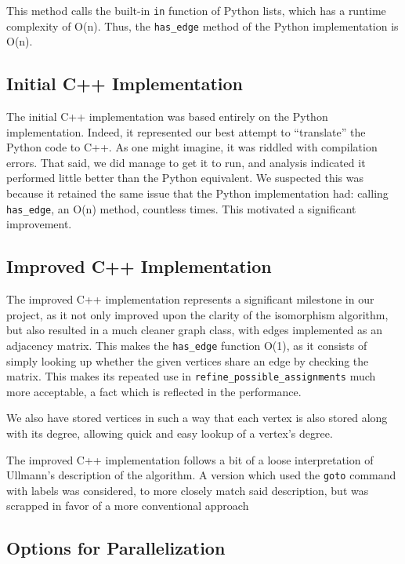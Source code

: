 \documentclass{article}
\begin{document}
  This method calls the built-in \texttt{in} function of Python lists, which has a runtime complexity of O(n).\cite{bigopy} Thus, the \texttt{has\_edge} method of the Python implementation is O(n).

  \subsection{Initial C++ Implementation}

  The initial C++ implementation was based entirely on the Python implementation. Indeed, it represented our best attempt to ``translate'' the Python code to C++. As one might imagine, it was riddled with compilation errors. That said, we did manage to get it to run, and analysis indicated it performed little better than the Python equivalent. We suspected this was because it retained the same issue that the Python implementation had: calling \texttt{has\_edge}, an O(n) method, countless times. This motivated a significant improvement.

  \subsection{Improved C++ Implementation}

  The improved C++ implementation represents a significant milestone in our project, as it not only improved upon the clarity of the isomorphism algorithm, but also resulted in a much cleaner graph class, with edges implemented as an adjacency matrix. This makes the \texttt{has\_edge} function O(1), as it consists of simply looking up whether the given vertices share an edge by checking the matrix. This makes its repeated use in \texttt{refine\_possible\_assignments} much more acceptable, a fact which is reflected in the performance.

  We also have stored vertices in such a way that each vertex is also stored along with its degree, allowing quick and easy lookup of a vertex's degree.

  The improved C++ implementation follows a bit of a loose interpretation of Ullmann's description of the algorithm. A version which used the \texttt{goto} command with labels was considered, to more closely match said description, but was scrapped in favor of a more conventional approach

  \subsection{Options for Parallelization}
\end{document}
